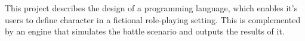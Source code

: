 This project describes the design of a programming language, which enables it's users to define character in a fictional role-playing setting. This is complemented by an engine that simulates the battle scenario and outputs the results of it.
